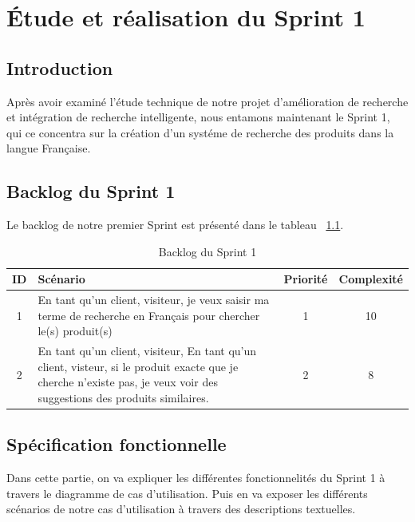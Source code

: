 \chapter{Étude et réalisation du Sprint 1}
\localtableofcontents
\section{Introduction}
\noindent
Après avoir examiné l'étude technique de notre projet d'amélioration de recherche et intégration de recherche intelligente, nous entamons maintenant le Sprint 1, qui ce concentra sur la création d'un systéme de recherche des produits dans la langue Française.

\section{Backlog du Sprint 1}
\noindent
Le backlog de notre premier Sprint est présenté dans le tableau ~\ref{tab:sprint1}.

\begin{table}[H]
	\centering

	\begin{tabularx}{\textwidth}{|c|X|c|c|}
		\hline
		\rowcolor{blue!20}
		\textbf{ID} & \textbf{Scénario}                                                                                     & \textbf{Priorité} & \textbf{Complexité} \\ \hline
		1           & En tant qu'un client, visiteur, je veux saisir ma terme de recherche en Français pour chercher le(s) produit(s) & 1                 & 10                  \\ \hline
		2           & En tant qu'un client, visiteur, En tant qu'un client, visteur, si le produit exacte que je cherche n'existe pas, je veux voir des suggestions des produits similaires. & 2                 & 8                  \\ \hline
	\end{tabularx}
	\caption{Backlog du Sprint 1}
	\label{tab:sprint1}
\end{table}

\section{Spécification fonctionnelle}
\noindent
Dans cette partie, on va expliquer les différentes fonctionnelités du Sprint 1 à travers le diagramme de cas d'utilisation. Puis en va exposer les différents scénarios de notre cas d'utilisation à travers des descriptions textuelles.

